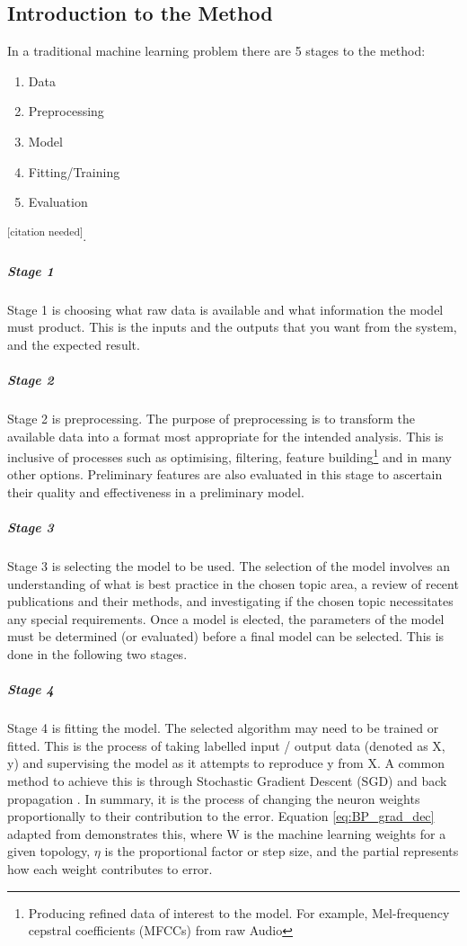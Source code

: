 \documentclass{UoNMCHA}
\newcommand{\citationneeded}{\textsuperscript{\color{blue} [citation needed]}}
\newcommand{\flagforreview}{\textsuperscript{\color{red} [FLAGGED FOR REVIEW]}}
\numberwithin{equation}{section}
\begin{document}
\subsection{Introduction to the Method}
In a traditional machine learning problem there are 5 stages to the method: 
\begin{enumerate}%
    \item Data
    \item Preprocessing
    \item Model
    \item Fitting/Training
    \item Evaluation
\end{enumerate}

\citationneeded.

\subparagraph{Stage 1}
Stage 1 is choosing what raw data is available and what information the model must product. This is the inputs and the outputs that you want from the system, and the expected result.

\subparagraph{Stage 2}
Stage 2 is preprocessing. The purpose of preprocessing is to transform the available data into a format most appropriate for the intended analysis. This is inclusive of processes such as optimising, filtering, feature building\footnote{Producing refined data of interest to the model. For example, Mel-frequency cepstral coefficients (MFCCs) from raw Audio} and in many other options. Preliminary features are also evaluated in this stage to ascertain their quality and effectiveness in a preliminary model.

\subparagraph{Stage 3}
Stage 3 is selecting the model to be used. The selection of the model involves an understanding of what is best practice in the chosen topic area, a review of recent publications and their methods, and investigating if the chosen topic necessitates any special requirements. Once a model is elected, the parameters of the model must be determined (or evaluated) before a final model can be selected. This is done in the following two stages.

\subparagraph{Stage 4}
Stage 4 is fitting the model. The selected algorithm may need to be trained or fitted. This is the process of taking labelled input / output data (denoted as X, y) and supervising the model as it attempts to reproduce y from X. A common method to achieve this is through Stochastic Gradient Descent (SGD) and back propagation \cite{lecun2012efficient}. In summary, it is the process of changing the neuron weights proportionally to their contribution to the error. Equation \ref{eq:BP_grad_dec} adapted from \cite{lecun2012efficient} demonstrates this, where W is the machine learning weights for a given topology, $\eta$ is the proportional factor or step size, and the partial represents how each weight contributes to error.\\
\end{document}
